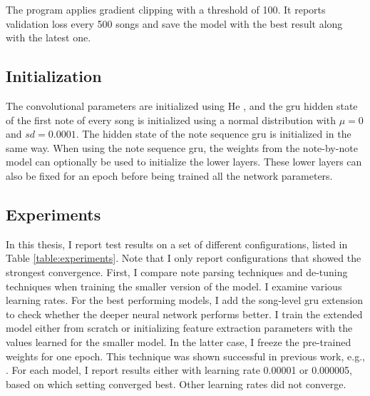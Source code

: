 The program applies gradient clipping \cite{pascanu2013difficulty} with a threshold of 100. It reports validation loss every 500 songs and save the model with the best result along with the latest one. 
\subsection{Initialization}
The convolutional parameters are initialized using He \cite{he2015delving}, and the \gls{gru} hidden state of the first note of every song is initialized using a normal distribution with $\mu=0$ and $sd=0.0001$. The hidden state of the note sequence \gls{gru} is initialized in the same way. When using the note sequence \gls{gru}, the weights from the note-by-note model can optionally be used to initialize the lower layers. These lower layers can also be fixed for an epoch before being trained all the network parameters. 

\subsection{Experiments}
\label{sec:experiment-list}
In this thesis, I report test results on a set of different configurations, listed in Table \ref{table:experiments}. Note that I only report configurations that showed the strongest convergence. First, I compare note parsing techniques and de-tuning techniques when training the smaller version of the model. I examine various learning rates. For the best performing models, I add the song-level \gls{gru} extension to check whether the deeper neural network performs better. I train the extended model either from scratch or initializing feature extraction parameters with the values learned for the smaller model. In the latter case, I freeze the pre-trained weights for one epoch. This technique was shown successful in previous work, e.g., \cite{wager2020fully}. For each model, I report results either with learning rate 0.00001 or 0.000005, based on which setting converged best. Other learning rates did not converge.

